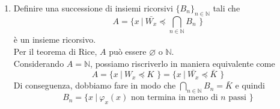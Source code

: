 \documentclass[a4paper,oneside,titlepage]{book}
\begin{document}
\begin{enumerate}[label=\fbox{\arabic*}]
\item Definire una successione di insiemi ricorsivi $\{B_n\}_{n \in \mathbb{N}}$ tali che
\[ A = \text{\{ } x \ | \ \bar{W_x} \preceq \bigcap_{n \in \mathbb{N}} B_n \text{ \}} \]
è un insieme ricorsivo.
\\ Per il teorema di Rice, $A$ può essere $\varnothing$ o $\mathbb{N}$.
\\ Considerando $A = \mathbb{N}$, possiamo riscriverlo in maniera equivalente come
\[ A = \text{\{ } x \ | \ W_x \preceq K \text{ \}} = \text{\{ } x \ | \ \bar{W_x} \preceq \bar{K} \text{ \}} \]
Di conseguenza, dobbiamo fare in modo che $\bigcap_{n \in \mathbb{N}} B_n = \bar{K}$ e quindi
\[ B_n = \text{\{ } x \ | \ \varphi_x(x) \text{ non termina in meno di } n \text{ passi \}} \]
\end{enumerate}
\end{document}
